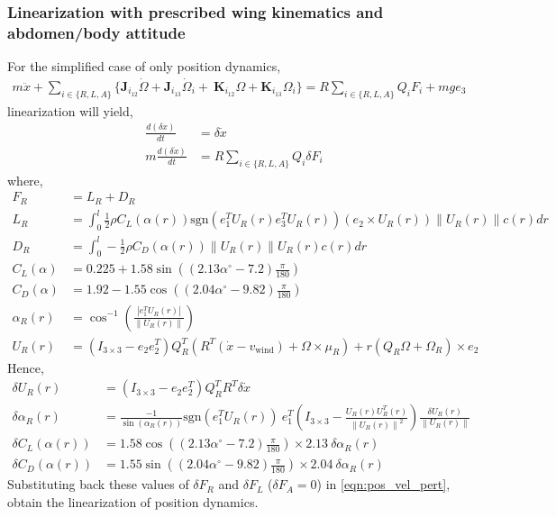 \documentclass[10pt]{article}
\newcommand{\norm}[1]{\ensuremath{\left\| #1 \right\|}}
\begin{document}
\subsubsection{Linearization with prescribed wing kinematics and abdomen/body attitude}
For the simplified case of only position dynamics,
\begin{align*}
m\ddot x + 
\sum_{i\in\{R,L,A\}} \big\{ \mathbf{J}_{i_{12}} \dot\Omega + \mathbf{J}_{i_{13}}\dot\Omega_i 
+ \ \mathbf{K}_{i_{12}}\Omega + \mathbf{K}_{i_{13}}\Omega_i \big\} = R\sum_{i\in\{R,L,A\}} Q_i F_i + mg e_3
\end{align*}
linearization will yield,
\begin{align}
\frac{d (\delta x)}{dt} &= \delta \dot{x} \nonumber \\
m \frac{d (\delta \dot{x} )}{dt} &= R \sum_{i\in\{R,L,A\}} Q_i \delta F_i \label{eqn:pos_vel_pert}
\end{align}
where,
\begin{align*}
F_R &= L_R + D_R \\
L_R &= \int_{0}^{l} \frac{1}{2}\rho  C_L(\alpha(r)) \mathrm{sgn} (e_1^T U_R(r) e_3^T U_R(r)) (e_2\times U_R(r))\|U_R(r)\| c(r) dr \\
D_R &= \int_{0}^{l} - \frac{1}{2}\rho  C_D(\alpha(r)) \|U_R(r)\|U_R(r) c(r) dr \\
C_L(\alpha) & = 0.225 + 1.58 \sin( (2.13\alpha^\circ - 7.2) \frac{\pi}{180}) \\
C_D(\alpha) & = 1.92 - 1.55 \cos( (2.04 \alpha^\circ - 9.82 ) \frac{\pi}{180}) \\
\alpha_R (r) & = \cos^{-1} ( \frac{|e_1^T U_R(r)|}{\|U_R(r)\|} ) \\
U_R(r) &= (I_{3\times 3}- e_2 e_2^T) Q_R^T( R^T (\dot x-v_{\mathrm{wind}}) + \Omega\times \mu_R ) + r  (Q_R\Omega + \Omega_R )\times e_2
\end{align*}
Hence,
\begin{align*}
\delta U_R(r) &= (I_{3\times 3}- e_2 e_2^T) Q_R^T R^T \delta\dot x \\
\delta \alpha_R(r) &= \frac{-1}{\sin(\alpha_R(r))} \mathrm{sgn}(e_1^T U_R(r))\ e_1^T\left(I_{3\times 3} - \frac{U_R(r)U_R^T(r)}{\norm{U_R(r)}^2}\right) \frac{\delta U_R(r)}{\norm{U_R(r)}} \\
\delta C_L(\alpha(r)) &= 1.58 \cos( (2.13\alpha^\circ - 7.2) \frac{\pi}{180}) \times 2.13\ \delta\alpha_R(r) \\
\delta C_D(\alpha(r)) &= 1.55 \sin( (2.04 \alpha^\circ - 9.82 ) \frac{\pi}{180}) \times 2.04\ \delta\alpha_R(r)
\end{align*}
Substituting back these values of $ \delta F_R $ and $ \delta F_L $ ($ \delta F_A = 0 $) in \eqref{eqn:pos_vel_pert}, obtain the linearization of position dynamics.
\end{document}
